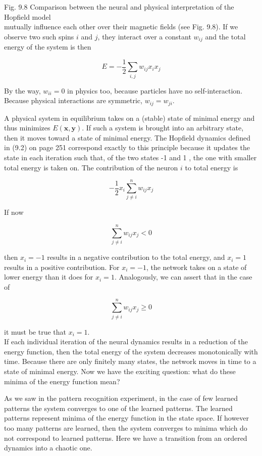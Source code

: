 \documentclass[10pt]{article}
\begin{document}
Fig. 9.8 Comparison between the neural and physical interpretation of the Hopfield model\\
mutually influence each other over their magnetic fields (see Fig. 9.8). If we observe two such spins $i$ and $j$, they interact over a constant $w_{i j}$ and the total energy of the system is then

$$
E=-\frac{1}{2} \sum_{i, j} w_{i j} x_{i} x_{j}
$$

By the way, $w_{i i}=0$ in physics too, because particles have no self-interaction. Because physical interactions are symmetric, $w_{i j}=w_{j i}$.

A physical system in equilibrium takes on a (stable) state of minimal energy and thus minimizes $E(\boldsymbol{x}, \boldsymbol{y})$. If such a system is brought into an arbitrary state, then it moves toward a state of minimal energy. The Hopfield dynamics defined in (9.2) on page 251 correspond exactly to this principle because it updates the state in each iteration such that, of the two states -1 and 1 , the one with smaller total energy is taken on. The contribution of the neuron $i$ to total energy is

$$
-\frac{1}{2} x_{i} \sum_{j \neq i}^{n} w_{i j} x_{j}
$$

If now

$$
\sum_{j \neq i}^{n} w_{i j} x_{j}<0
$$

then $x_{i}=-1$ results in a negative contribution to the total energy, and $x_{i}=1$ results in a positive contribution. For $x_{i}=-1$, the network takes on a state of lower energy than it does for $x_{i}=1$. Analogously, we can assert that in the case of

$$
\sum_{j \neq i}^{n} w_{i j} x_{j} \geq 0
$$

it must be true that $x_{i}=1$.\\
If each individual iteration of the neural dynamics results in a reduction of the energy function, then the total energy of the system decreases monotonically with time. Because there are only finitely many states, the network moves in time to a state of minimal energy. Now we have the exciting question: what do these minima of the energy function mean?

As we saw in the pattern recognition experiment, in the case of few learned patterns the system converges to one of the learned patterns. The learned patterns represent minima of the energy function in the state space. If however too many patterns are learned, then the system converges to minima which do not correspond to learned patterns. Here we have a transition from an ordered dynamics into a chaotic one.
\end{document}
